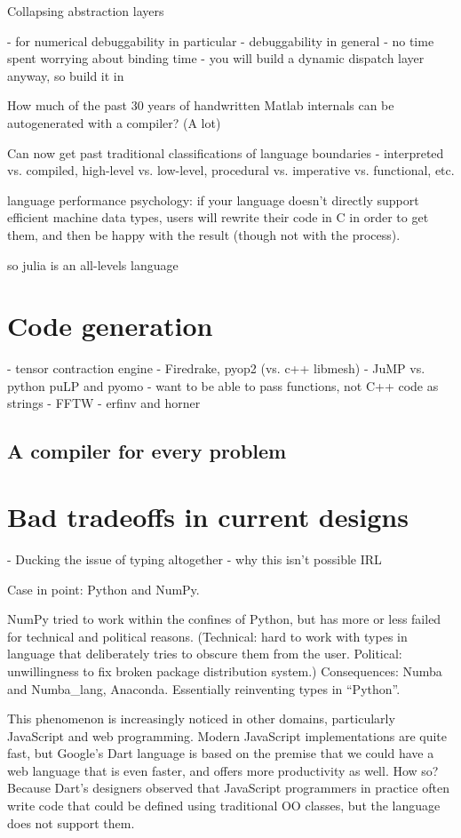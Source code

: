 {Collapsing abstraction layers

- for numerical debuggability in particular
- debuggability in general
- no time spent worrying about binding time
- you will build a dynamic dispatch layer anyway, so build it in


How much of the past 30 years of handwritten Matlab internals can
be autogenerated with a compiler? (A lot)

Can now get past traditional classifications of language boundaries
- interpreted vs. compiled, high-level vs. low-level, procedural vs.
imperative vs. functional, etc.

language performance psychology:
if your language doesn't directly support efficient machine data types,
users will rewrite their code in C in order to get them, and then be
happy with the result (though not with the process).

so julia is an all-levels language


\section{Code generation}

- tensor contraction engine
- Firedrake, pyop2 (vs. c++ libmesh)
- JuMP vs. python puLP and pyomo
  - want to be able to pass functions, not C++ code as strings
- FFTW
- erfinv and horner

\subsection{A compiler for every problem}


\section{Bad tradeoffs in current designs}


- Ducking the issue of typing altogether - why this isn't possible IRL

Case in point: Python and NumPy.

NumPy tried to work within the confines of Python, but has more or
less failed for technical and political reasons. (Technical: hard
to work with types in language that deliberately tries to obscure
them from the user. Political: unwillingness to fix broken package
distribution system.) Consequences: Numba and Numba\_lang, Anaconda.
Essentially reinventing types in ``Python''. 

This phenomenon is increasingly noticed in other domains, particularly
JavaScript and web programming. Modern JavaScript implementations are
quite fast, but Google's Dart language is based on the premise that
we could have a web language that is even faster, and offers more
productivity as well. How so? Because Dart's designers observed that
JavaScript programmers in practice often write code that could be
defined using traditional OO classes, but the language does not
support them.

}

